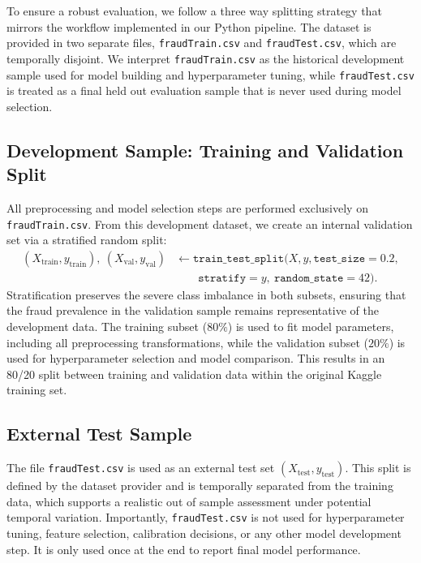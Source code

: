 \documentclass[oneside,12pt,parskip=half,american,numbers=noenddot]{scrreprt}
\begin{document}
To ensure a robust evaluation, we follow a three way splitting strategy that mirrors the workflow implemented in our Python pipeline. The dataset is provided in two separate files, \texttt{fraudTrain.csv} and \texttt{fraudTest.csv}, which are temporally disjoint. We interpret \texttt{fraudTrain.csv} as the historical development sample used for model building and hyperparameter tuning, while \texttt{fraudTest.csv} is treated as a final held out evaluation sample that is never used during model selection.

\subsection{Development Sample: Training and Validation Split}

All preprocessing and model selection steps are performed exclusively on \texttt{fraudTrain.csv}. From this development dataset, we create an internal validation set via a stratified random split:
\[
\begin{aligned}
(X_{\text{train}}, y_{\text{train}}),\ (X_{\text{val}}, y_{\text{val}})
&\leftarrow \texttt{train\_test\_split}(X, y, \texttt{test\_size}=0.2, \\
&\qquad\texttt{stratify}=y,\ \texttt{random\_state}=42).
\end{aligned}
\]
Stratification preserves the severe class imbalance in both subsets, ensuring that the fraud prevalence in the validation sample remains representative of the development data. The training subset (\(80\%\)) is used to fit model parameters, including all preprocessing transformations, while the validation subset (\(20\%\)) is used for hyperparameter selection and model comparison. This results in an 80/20 split between training and validation data within the original Kaggle training set.

\subsection{External Test Sample}

The file \texttt{fraudTest.csv} is used as an external test set \((X_{\text{test}}, y_{\text{test}})\). This split is defined by the dataset provider and is temporally separated from the training data, which supports a realistic out of sample assessment under potential temporal variation. Importantly, \texttt{fraudTest.csv} is not used for hyperparameter tuning, feature selection, calibration decisions, or any other model development step. It is only used once at the end to report final model performance.
\end{document}
